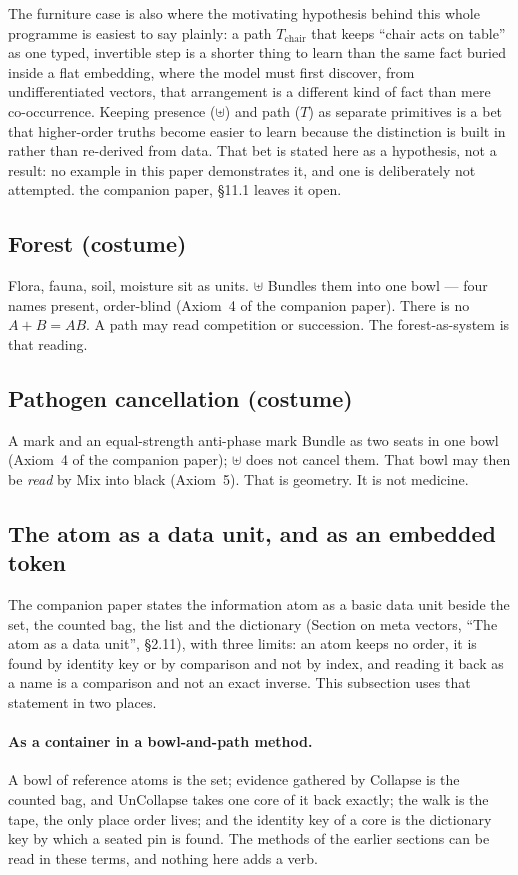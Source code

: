 \documentclass[12pt, a4paper]{article}
\begin{document}
The furniture case is also where the motivating hypothesis behind
this whole programme is easiest to say plainly: a path $T_{\mathrm{chair}}$
that keeps ``chair acts on table'' as one typed, invertible step is a
shorter thing to learn than the same fact buried inside a flat
embedding, where the model must first discover, from undifferentiated
vectors, that arrangement is a different kind of fact than mere
co-occurrence. Keeping presence ($\uplus$) and path ($T$) as separate
primitives is a bet that higher-order truths become easier to learn
because the distinction is built in rather than re-derived from data.
That bet is stated here as a hypothesis, not a result: no example in
this paper demonstrates it, and one is deliberately not attempted.
the companion paper, \S11.1 leaves it open.

\subsection{Forest (costume)}
Flora, fauna, soil, moisture sit as units. $\uplus$ Bundles them into
one bowl --- four names present, order-blind
(Axiom~4 of the companion paper).
There is no $A+B=AB$. A path may read competition or succession.
The forest-as-system is that reading.

\subsection{Pathogen cancellation (costume)}
A mark and an equal-strength anti-phase mark Bundle as two seats in
one bowl (Axiom~4 of the companion paper); $\uplus$ does not
cancel them. That bowl may then be \emph{read} by Mix into black
(Axiom~5). That is geometry. It is not
medicine.



\subsection{The atom as a data unit, and as an embedded token}
\label{subsec:atom_data_unit}
The companion paper states the information atom as a basic data unit beside the set, the counted bag, the list and the dictionary (Section on meta vectors, ``The atom as a data unit'', \S2.11), with three limits: an atom keeps no order, it is found by identity key or by comparison and not by index, and reading it back as a name is a comparison and not an exact inverse. This subsection uses that statement in two places.

\paragraph{As a container in a bowl-and-path method.} A bowl of reference atoms is the set; evidence gathered by Collapse is the counted bag, and UnCollapse takes one core of it back exactly; the walk is the tape, the only place order lives; and the identity key of a core is the dictionary key by which a seated pin is found. The methods of the earlier sections can be read in these terms, and nothing here adds a verb.
\end{document}
